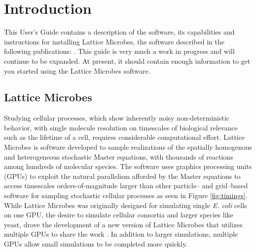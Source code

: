 \chapter{Introduction}

This User's Guide contains a description of the software, its capabilities and instructions for installing Lattice Microbes, the software described in the following publications: \cite{Roberts2009lts,Roberts2013lmh,Hallock2014sor}. This guide is very much a work in progress and will continue to be expanded. At present, it should contain enough information to get you started using the Lattice Microbes software.

\section{Lattice Microbes}
Studying cellular processes, which show inherently noisy non-deterministic behavior, with single molecule resolution on timescales of biological relevance such as the lifetime of a cell, requires considerable computational effort.  Lattice Microbes \cite{Roberts2009lts,Roberts2013lmh} is software developed to sample realizations of the spatially homogenous and heterogeneous stochastic Master equations, with thousands of reactions among hundreds of molecular species.  The software uses graphics processing units (GPUs) to exploit the natural parallelism afforded by the Master equations to access timescales orders-of-magnitude larger than other particle-- and grid--based software for sampling stochastic cellular processes as seen in Figure \ref{fig:timings}. While Lattice Microbes was originally designed for simulating single \emph{E. coli} cells on one GPU, the desire to simulate cellular consortia and larger species like yeast, drove the development of a new version of Lattice Microbes that utilizes multiple GPUs to share the work \cite{Hallock2014sor}. In addition to larger simulations, multiple GPUs allow small simulations to be completed more quickly.

